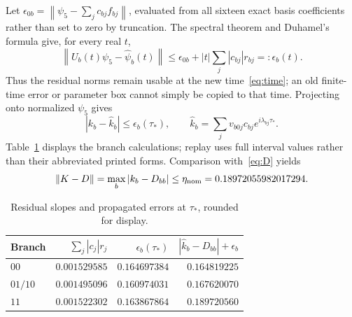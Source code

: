\documentclass[11pt]{article}
\newcommand{\norm}[1]{\left\lVert#1\right\rVert}
\begin{document}
Let $\epsilon_{0b}=\norm{\psi_5-\sum_jc_{bj}f_{bj}}$, evaluated from all sixteen exact basis coefficients rather than set to zero by truncation.
The spectral theorem and Duhamel's formula give, for every real $t$,
\begin{equation}
 \norm{U_b(t)\psi_5-\widehat\psi_b(t)}
 \leq\epsilon_{0b}+|t|\sum_j|c_{bj}|r_{bj}=: \epsilon_b(t).\label{eq:duhamel}
\end{equation}
Thus the residual norms remain usable at the new time~\eqref{eq:time}; an old finite-time error or parameter box cannot simply be copied to that time.
Projecting onto normalized $\psi_5$ gives
\begin{equation}
 |k_b-\widehat k_b|\leq\epsilon_b(\tau_*),\qquad
 \widehat k_b=\sum_jv_{b0j}c_{bj}e^{i\lambda_{bj}\tau_*}.\label{eq:amplitude}
\end{equation}
Table~\ref{tab:branches} displays the branch calculations; replay uses full interval values rather than their abbreviated printed forms.
Comparison with~\eqref{eq:D} yields
\begin{equation}
 \norm{K-D}=\max_b|k_b-D_{bb}|\leq
 \eta_{\rm nom}=0.18972055982017294.\label{eq:eta}
\end{equation}
\begin{table}[htbp]
\centering
\caption{Residual slopes and propagated errors at $\tau_*$, rounded for display.}
\label{tab:branches}
\begin{tabular}{lrrr}
\toprule
Branch & $\sum_j|c_j|r_j$ & $\epsilon_b(\tau_*)$ & $|\widehat k_b-D_{bb}|+\epsilon_b$\\
\midrule
$00$ & $0.001529585$ & $0.164697384$ & $0.164819225$\\
$01/10$ & $0.001495096$ & $0.160974031$ & $0.167620070$\\
$11$ & $0.001522302$ & $0.163867864$ & $0.189720560$\\
\bottomrule
\end{tabular}
\end{table}
\end{document}
